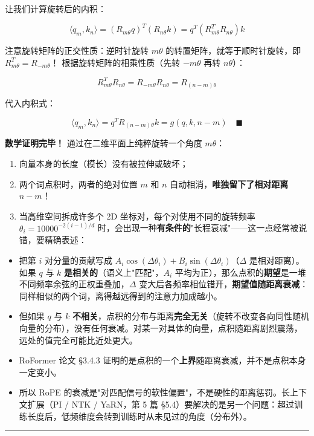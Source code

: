 让我们计算旋转后的内积：

\[
\langle q_m, k_n \rangle = (R_{m \theta} q)^T (R_{n \theta} k) = q^T (R_{m \theta}^T R_{n \theta}) k
\]

注意旋转矩阵的正交性质：逆时针旋转 $m\theta$ 的转置矩阵，就等于顺时针旋转，即 $R_{m \theta}^T = R_{-m \theta}$！
根据旋转矩阵的相乘性质（先转 $-m\theta$ 再转 $n\theta$）：

\[
R_{m \theta}^T R_{n \theta} = R_{-m \theta} R_{n \theta} = R_{(n - m) \theta}
\]

代入内积式：

\[
\langle q_m, k_n \rangle = q^T R_{(n - m) \theta} k = g(q, k, n - m) \quad \blacksquare
\]

\textbf{数学证明完毕！}
通过在二维平面上纯粹旋转一个角度 $m\theta$：
\begin{enumerate}
  \item 向量本身的长度（模长）没有被拉伸或破坏；
  \item 两个词点积时，两者的绝对位置 $m$ 和 $n$ 自动相消，\textbf{唯独留下了相对距离 $n - m$}！
  \item 当高维空间拆成许多个 2D 坐标对，每个对使用不同的旋转频率 $\theta_i = 10000^{-2(i-1)/d}$ 时，会出现一种\textbf{有条件的}"长程衰减"——这一点经常被说错，要精确表述：
\end{enumerate}

\begin{itemize}
  \item 把第 $i$ 对分量的贡献写成 $A_i \cos(\Delta\theta_i) + B_i \sin(\Delta\theta_i)$（$\Delta$ 是相对距离）。如果 $q$ 与 $k$ \textbf{是相关的}（语义上"匹配"，$A_i$ 平均为正），那么点积的\textbf{期望}是一堆不同频率余弦的正权重叠加，$\Delta$ 变大后各频率相位错开，\textbf{期望值随距离衰减}：同样相似的两个词，离得越远得到的注意力加成越小。
  \item 但如果 $q$ 与 $k$ \textbf{不相关}，点积的分布与距离\textbf{完全无关}（旋转不改变各向同性随机向量的分布），没有任何衰减。对某一对具体的向量，点积随距离剧烈震荡，远处的值完全可能比近处更大。
  \item RoFormer 论文 §3.4.3 证明的是点积的一个\textbf{上界}随距离衰减，并不是点积本身一定变小。
  \item 所以 RoPE 的衰减是"对匹配信号的软性偏置"，不是硬性的距离惩罚。长上下文扩展（PI / NTK / YaRN，第 5 篇 §5.4）要解决的是另一个问题：超过训练长度后，低频维度会转到训练时从未见过的角度（分布外）。
\end{itemize}

\vspace{0.8em}\hrule\vspace{0.8em}

